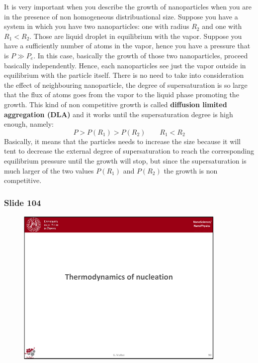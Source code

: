\documentclass[../main/main.tex]{subfiles}
\begin{document}
It is very important when you describe the growth of nanoparticles when you are in the presence of non homogeneous distribuational size. Suppose you have a system in which you have two nanoparticles: one with radius \( R_2 \) and one with \( R_1<R_2 \). Those are liquid droplet in equilibrium with the vapor.
Suppose you have a sufficiently number of atoms in the vapor, hence you have a pressure that is \( P \gg P_e \). In this case, basically the growth of those two nanoparticles, proceed basically independently. Hence, each nanoparticles see just the vapor outside in equilibrium with the particle itself. There is no need to take into consideration the effect of neighbouring nanoparticle, the degree of supersaturation is so large that the flux of atoms goes from the vapor to the liquid phase promoting the growth. This kind of non competitive growth is called \textbf{diffusion limited aggregation (DLA)} and it works until the supersaturation degree is high enough, namely:
\begin{equation*}
  P > P(R_1) > P(R_2) \quad \quad R_1 < R_2
\end{equation*}
Basically, it means that the particles needs to increase the size because it will tent to decrease the external degree of supersaturation to reach the corresponding equilibrium pressure until the growth will stop, but since the supersaturation is much larger of the two values \( P(R_1) \) and \( P(R_2) \) the growth is non competitive.

\newpage
\subsubsection{Slide 104}

\begin{figure}[h!]
\centering
\includegraphics[page=15,width=0.9\textwidth]{../lessons/pdf_file/6_lesson.pdf}
\end{figure}
\end{document}
